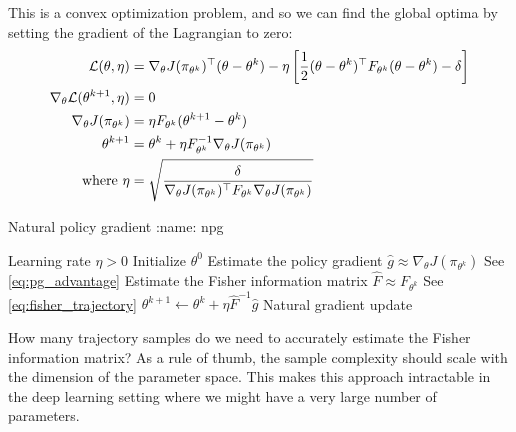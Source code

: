 \documentclass[\main/main]{subfiles}
\begin{document}
This is a convex optimization problem, and so we can find the global optima by setting the gradient of the Lagrangian to zero:
\begin{align*}
    \mathcal{L}(\theta, \eta)                     & = \nabla_\theta J(\pi_{\theta^k})^\top (\theta - \theta^k) - \eta \left[ \frac{1}{2} (\theta - \theta^k)^\top F_{\theta^k} (\theta - \theta^k) - \delta \right] \\
    \nabla_\theta \mathcal{L}(\theta^{k+1}, \eta) & = 0                                                                                                                                                             \\
    \nabla_\theta J(\pi_{\theta^k})        & = \eta F_{\theta^k} (\theta^{k+1} - \theta^k)                                                                                                                   \\
    \theta^{k+1}                           & = \theta^k + \eta F_{\theta^k}^{-1} \nabla_\theta J(\pi_{\theta^k})                                                                                             \\
    \text{where } \eta                     & = \sqrt{\frac{\delta}{\nabla_\theta J(\pi_{\theta^k})^\top F_{\theta^k} \nabla_\theta J(\pi_{\theta^k})}}
\end{align*}

\begin{definition}{Natural policy gradient}
:name: npg

    \begin{algorithmic}
        \Require Learning rate $\eta > 0$
        \State Initialize $\theta^0$
        \State Estimate the policy gradient $\hat g \approx \nabla_\theta J(\pi_{\theta^k})$
        \Comment See \eqref{eq:pg_advantage}
        \State Estimate the Fisher information matrix $\hat F \approx F_{\theta^k}$
        \Comment See \eqref{eq:fisher_trajectory}
        \State $\theta^{k+1} \gets \theta^k + \eta \hat F^{-1} \hat g$
        \Comment Natural gradient update
        \EndFor
    \end{algorithmic}

    How many trajectory samples do we need to accurately estimate the Fisher information matrix? As a rule of thumb, the sample complexity should scale with the dimension of the parameter space. This makes this approach intractable in the deep learning setting where we might have a very large number of parameters.
\end{definition}
\end{document}

